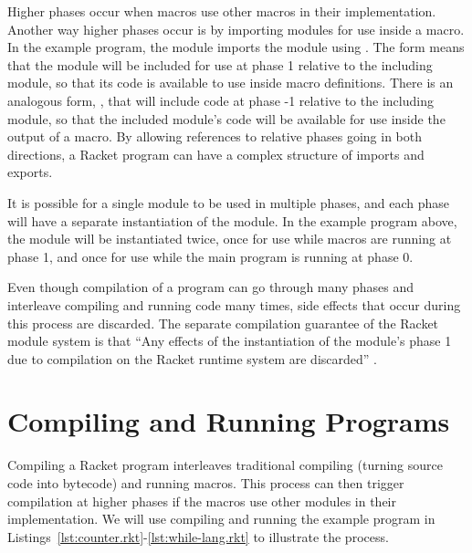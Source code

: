Higher phases occur when macros use other macros in their implementation.
Another way higher phases occur is by importing modules for use inside a macro.
In the example program, the  module imports the  module using .
The  form means that the module will be included for use at phase 1 relative to the including module, so that its code is available to use inside macro definitions.
There is an analogous form, , that will include code at phase -1 relative to the including module, so that the included module's code will be available for use inside the output of a macro. 
By allowing references to relative phases going in both directions, a Racket program can have a complex structure of imports and exports.

It is possible for a single module to be used in multiple phases, and each phase will have a separate instantiation of the module.
In the example program above, the  module will be instantiated twice, once for use while macros are running at phase 1, and once for use while the main program is running at phase 0.

Even though compilation of a program can go through many phases and interleave compiling and running code many times, side effects that occur during this process are discarded. 
The separate compilation guarantee of the Racket module system is that ``Any effects of the instantiation of the module's phase 1 due to compilation on the Racket runtime system are discarded'' \cite{sep}. 


\section{Compiling and Running Programs}

Compiling a Racket program interleaves traditional compiling (turning source code into bytecode) and running macros.
This process can then trigger compilation at higher phases if the macros use other modules in their implementation.
We will use compiling and running the example program in Listings~\ref{lst:counter.rkt}-\ref{lst:while-lang.rkt} to illustrate the process.

